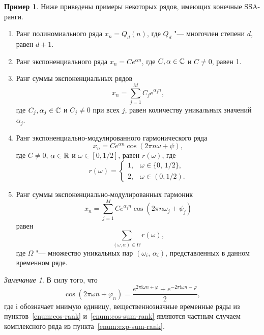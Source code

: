 \documentclass[specialist,
  substylefile = spbu.rtx,
subf,href,colorlinks=true, 12pt]{disser}
\theoremstyle{plain}
\theoremstyle{definition}
\newtheorem{example}{Пример}[section]
\theoremstyle{remark}
\newtheorem{remark}{Замечание}[section]
\newcommand{\iu}{\mathrm{i}}
\begin{document}
\begin{example}
  \label{ex:ssa-ranks}
  Ниже приведены примеры некоторых рядов, имеющих конечные SSA-ранги.
  \begin{enumerate}
    \item Ранг полиномиального ряда $x_n = Q_d(n)$, где $Q_d$ "---
      многочлен степени $d$, равен $d + 1$.
    \item\label{enum:exp-rank} Ранг экспоненциального ряда $x_n = C
      e^{\alpha n}$, где
      $C, \alpha \in \mathbb{C}$ и $C \ne 0$, равен 1.
    \item\label{enum:exp-sum-rank} Ранг суммы экспоненциальных рядов
      \[
        x_n = \sum_{j=1}^{M} C_j e^{\alpha_j n},
      \]
      где $C_j, \alpha_j \in \mathbb{C}$ и $C_j \ne 0$ при всех $j$, равен
      количеству уникальных
      значений $\alpha_j$.
    \item\label{enum:cos-rank} Ранг экспоненциально-модулированного
      гармонического ряда
      \[
        x_n = C e^{\alpha n}\cos(2 \pi n \omega + \psi),
      \]
      где $C \ne 0$, $\alpha \in \mathbb{R}$ и $\omega \in [0,1/2]$,
      равен $r(\omega)$, где
      \begin{equation}
        \label{eq:cos-rank}
        r(\omega) =
        \begin{cases}
          1, & \omega \in \{0,\, 1/2\},\\
          2, & \omega \in (0, 1/2).
        \end{cases}
      \end{equation}
    \item\label{enum:cos-sum-rank} Ранг суммы
      экспоненциально-модулированных гармоник
      \[
        x_n = \sum_{j=1}^{M} C e^{\alpha_j n}\cos(2 \pi n \omega_j + \psi_j)
      \]
      равен
      \begin{equation*}
        \label{eq:cos-sum-rank}
        \sum_{(\omega, \alpha)\in \Omega} r(\omega),
      \end{equation*}
      где $\Omega$ "--- множество уникальных пар $(\omega_i,\,
      \alpha_i)$, представленных в данном временном ряде.
  \end{enumerate}
\end{example}

\begin{remark}\label{remark:cos-exp}
  В силу того, что
  \[
    \cos(2 \pi \omega n + \varphi_n) =
    \frac{e^{2\pi \iu \omega n + \varphi} + e^{-2\pi \iu \omega n -
    \varphi}}{2},
  \]
  где $\iu$ обозначает мнимую единицу,
  вещественнозначные временные ряды из
  пунктов~\ref{enum:cos-rank} и~\ref{enum:cos-sum-rank} являются
  частным случаем комплексного ряда из пункта~\ref{enum:exp-sum-rank}.
\end{remark}
\end{document}
